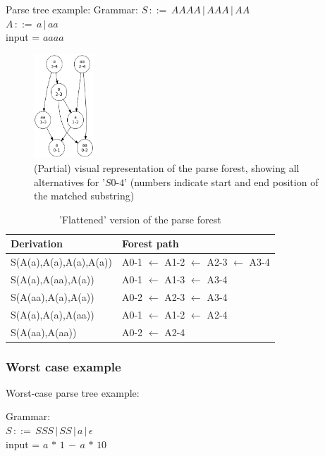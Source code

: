 \documentclass[a4paper,10pt]{article}
\begin{document}
Parse tree example:
Grammar:
$S\,::=\,AAAA\,|\,AAA\,|\,AA$\\
$A\,::=\,a\,|\,aa$\\
input = $aaaa$

\begin{figure}[H]
\centering
\includegraphics[width=0.2\textwidth]{a_aa-forest.png}
\caption{(Partial) visual representation of the parse forest, showing all alternatives for '$S0$-$4$' (numbers indicate start and end position of the matched substring)}
\end{figure}

\begin{table}[H]
\centering
\begin{tabular}{ p{15em} p{15em} }
Derivation & Forest path\\
\hline
S(A(a),A(a),A(a),A(a)) & A0-1 $\leftarrow$ A1-2 $\leftarrow$ A2-3 $\leftarrow$ A3-4\\
S(A(a),A(aa),A(a)) & A0-1 $\leftarrow$ A1-3 $\leftarrow$ A3-4\\
S(A(aa),A(a),A(a)) & A0-2 $\leftarrow$ A2-3 $\leftarrow$ A3-4\\
S(A(a),A(a),A(aa)) & A0-1 $\leftarrow$ A1-2 $\leftarrow$ A2-4\\
S(A(aa),A(aa)) & A0-2 $\leftarrow$ A2-4
\end{tabular}
\caption{'Flattened' version of the parse forest}
\end{table}

\subsubsection{Worst case example}

Worst-case parse tree example:

Grammar:\\
$S\,::=\,SSS\,|\,SS\,|\,a\,|\,\epsilon$\\
input = $a\,*\,1\,-\,a\,*\,10$
\end{document}
